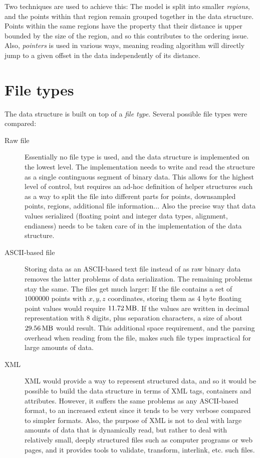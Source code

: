 \documentclass[a4paper,10pt,abstracton,notitlepage]{scrreprt}
\begin{document}
Two techniques are used to achieve this: The model is split into smaller \emph{regions}, and the points within that region remain grouped together in the data structure. Points within the same regions have the property that their distance is upper bounded by the size of the region, and so this contributes to the ordering issue. Also, \emph{pointers} is used in various ways, meaning reading algorithm will directly jump to a given offset in the data independently of its distance.

\section{File types}
The data structure is built on top of a \emph{file type}. Several possible file types were compared:
\begin{description}
\item[Raw file] Essentially no file type is used, and the data structure is implemented on the lowest level. The implementation needs to write and read the structure as a single continguous segment of binary data. This allows for the highest level of control, but requires an ad-hoc definition of helper structures such as a way to split the file into different parts for points, downsampled points, regions, additional file information... Also the precise way that data values serialized (floating point and integer data types, alignment, endianess) needs to be taken care of in the implementation of the data structure.
\item[ASCII-based file] Storing data as an ASCII-based text file instead of as raw binary data removes the latter problems of data serialization. The remaining problems stay the same. The files get much larger: If the file contains a set of $1000000$ points with $x, y, z$ coordinates, storing them as 4 byte floating point values would require $\SI{11. 72}{\mega\byte}$. If the values are written in decimal representation with 8 digits, plus separation characters, a size of about $\SI{29. 56}{\mega\byte}$ would result. This additional space requirement, and the parsing overhead when reading from the file, makes such file types impractical for large amounts of data.
\item[XML] XML would provide a way to represent structured data, and so it would be possible to build the data structure in terms of XML tags, containers and attributes. However, it suffers the same problems as any ASCII-based format, to an increased extent since it tends to be very verbose compared to simpler formats. Also, the purpose of XML is not to deal with large amounts of data that is dynamically read, but rather to deal with relatively small, deeply structured files such as computer programs or web pages, and it provides tools to validate, transform, interlink, etc. such files.

\end{description}
\end{document}
